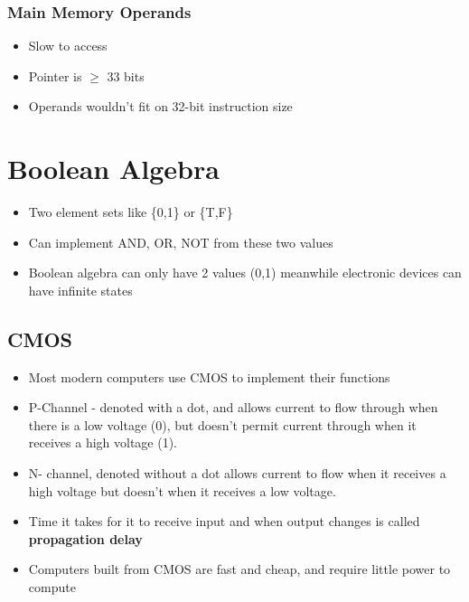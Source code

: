 \documentclass{article}
\begin{document}
\subsubsection{Main Memory Operands}

\begin{itemize}
    \item Slow to access
    \item Pointer is $\geq$ 33 bits
    \item Operands wouldn't fit on 32-bit instruction size 
\end{itemize}

\section{Boolean Algebra}

\begin{itemize}
    \item Two element sets like \{0,1\} or \{T,F\}
    
    \item Can implement AND, OR, NOT from these two values
    
    \item Boolean algebra can only have 2 values (0,1) meanwhile electronic devices can have infinite states
    
    
\end{itemize}

\subsection{CMOS}

\begin{itemize}
    \item Most modern computers use CMOS to implement their functions
    
    \item P-Channel - denoted with a dot, and allows current to flow through when there is a low voltage (0), but doesn't permit current through when it receives a high voltage (1).
    
    \item N- channel, denoted without a dot allows current to flow when it receives a high voltage but doesn't when it receives a low voltage.
    
    \item Time it takes for it to receive input and when output changes is called \textbf{propagation delay}
    
    \item Computers built from CMOS are fast and cheap, and require little power to compute
    
    \end{itemize}
\end{document}
